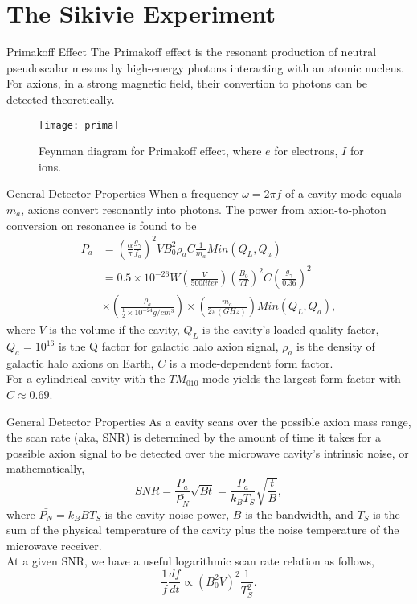 \documentclass{beamer}
\begin{document}
\section{The Sikivie Experiment}
\begin{frame}{Primakoff Effect}
The Primakoff effect is the resonant production of neutral pseudoscalar mesons by high-energy photons interacting with an atomic nucleus. \\
For axions, in a strong magnetic field, their convertion to photons can be detected theoretically.  
\begin{figure}
    \caption{Feynman diagram for Primakoff effect, where $e$ for electrons, $I$ for ions.}
    \centering
    \texttt{[image: prima]}
\end{figure}
\end{frame}
\begin{frame}{General Detector Properties}
When a frequency $\omega=2 \pi f$ of a cavity mode equals $m_a$, axions convert resonantly into photons. The power from axion-to-photon conversion
on resonance is found to be
\begin{equation*}
\begin{split}
P_a &= (\frac{\alpha}{\pi} \frac{g_\gamma}{f_a})^2 V B_0^2 \rho_a C \frac{1}{m_a} Min(Q_L,Q_a)\\
&=0.5\times10^{-26}W(\frac{V}{500 liter})(\frac{B_0}{7 T})^2 C (\frac{g_\gamma}{0.36})^2\\
&\times (\frac{\rho_a}{\frac{1}{2}\times10^{-24}g/cm^3})\times (\frac{m_a}{2\pi(GHz)})Min(Q_L,Q_a),
\end{split}
\end{equation*}
where $V$ is the volume if the cavity, $Q_L$ is the cavity's loaded quality factor, $Q_a = 10^{16}$ is the Q factor for galactic halo axion signal, $\rho_a$ is the density of galactic halo axions on Earth, $C$ is a mode-dependent form factor.\\
For a cylindrical cavity with  the $TM_{010}$ mode yields the largest form factor with $C \approx 0.69$.
\end{frame}
\begin{frame}{General Detector Properties}
As a cavity scans over the
possible axion mass range, the scan rate (aka, SNR) is determined
by the amount of time it takes for a possible axion signal
to be detected over the microwave cavity’s intrinsic noise, or mathematically,$$
SNR = \frac{P_a}{\bar{P_N}}\sqrt{Bt} = \frac{P_a}{k_BT_S}\sqrt{\frac{t}{B}},$$
where $\bar{P_N}= k_BBT_S$ is the cavity noise power, $B$ is the bandwidth, and $T_S$
is the sum of the physical
temperature of the cavity plus the noise temperature of
the microwave receiver.\\
At a given SNR, we have a useful logarithmic scan rate relation as follows,
$$\frac{1}{f}\frac{df}{dt} \propto (B_0^2V)^2\frac{1}{T_S^2}.$$
\end{frame}
\end{document}
